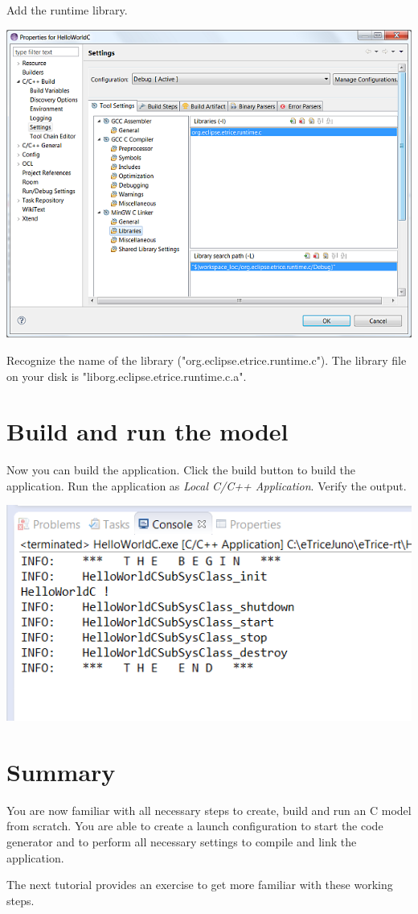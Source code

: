 Add the runtime library.

\includegraphics{images/034-HelloWorldC15.png}

Recognize the name of the library ("org.eclipse.etrice.runtime.c"). The library file on your disk is 
"liborg.eclipse.etrice.runtime.c.a". 

\section{Build and run the model}

Now you can build the application. Click the build button to build the application.
Run the application as \textit{Local C/C++ Application}.
Verify the output.

\includegraphics{images/034-HelloWorldC16.png}

\section{Summary}

You are now familiar with all necessary steps to create, build and run an \eTrice{} C model from scratch. You 
are able to create a launch configuration to start the code generator and to perform all necessary 
settings to compile and link the application.  

The next tutorial provides an exercise to get more familiar with these working steps.
